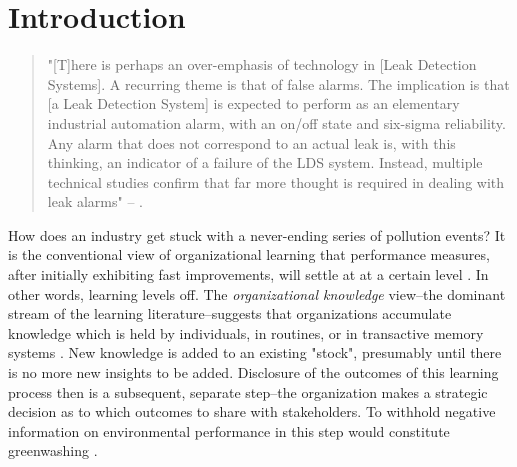 \section{Introduction}

\begin{singlespace} 
	\begin{quote}
		"[T]here is perhaps an over-emphasis of technology in [Leak Detection Systems]. A recurring theme is that of false alarms. The implication is that [a Leak Detection System] is expected to perform as an elementary industrial automation alarm, with an on/off state and six-sigma reliability. Any alarm that does not correspond to an actual leak is, with this thinking, an indicator of a failure of the LDS system. Instead, multiple technical studies confirm that far more thought is required in dealing with leak alarms" -- \citet[p. 2-3]{Shaw2012}.
	\end{quote}
\end{singlespace}

How does an industry get stuck with a never-ending series of pollution events? It is the conventional view of organizational learning that performance measures, after initially exhibiting fast improvements, will settle at at a certain level \citep{Argote2013-1}. In other words, learning levels off. The \textit{organizational knowledge} view--the dominant stream of the learning literature--suggests that organizations accumulate knowledge which is held by individuals, in routines, or in transactive memory systems \citep{Bingham2011, Argote2011}. New knowledge is added to an existing "stock", presumably until there is no more new insights to be added. Disclosure of the outcomes of this learning process then is a subsequent, separate step--the organization makes a strategic decision as to which outcomes to share with stakeholders. To withhold negative information on environmental performance in this step would constitute greenwashing \citep{Lyon2011}.

